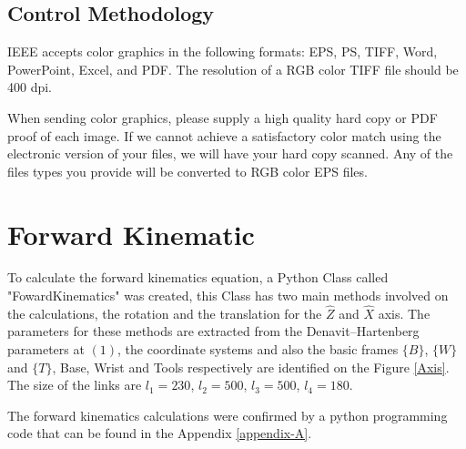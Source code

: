 \documentclass[transmag]{IEEEtran}
\begin{document}
\subsection{Control Methodology}

IEEE accepts color graphics in the following formats: EPS, PS, TIFF, Word, 
PowerPoint, Excel, and PDF. The resolution of a RGB color TIFF file should 
be 400 dpi. 

When sending color graphics, please supply a high quality hard copy or PDF 
proof of each image. If we cannot achieve a satisfactory color match using 
the electronic version of your files, we will have your hard copy scanned. 
Any of the files types you provide will be converted to RGB color EPS files. 











\clearpage
\newpage
















\section{Forward Kinematic}


To calculate the forward kinematics equation, a Python Class called "FowardKinematics" was created, this Class has two main methods involved on the calculations, the rotation and the translation for the $\hat Z$ and $\hat X$ axis. The parameters for these methods are extracted from the Denavit–Hartenberg parameters at $(1)$, the coordinate systems and also the basic frames $\{B\}$, $\{W\}$ and $\{T\}$, Base, Wrist and Tools respectively are identified on the Figure \ref{Axis}. The size of the links are $l_1 = 230$, $l_2 = 500$, $l_3 = 500$, $l_4 = 180$.

The forward kinematics calculations were confirmed by a python programming code that can be found in the Appendix \ref{appendix-A}. 
\end{document}
